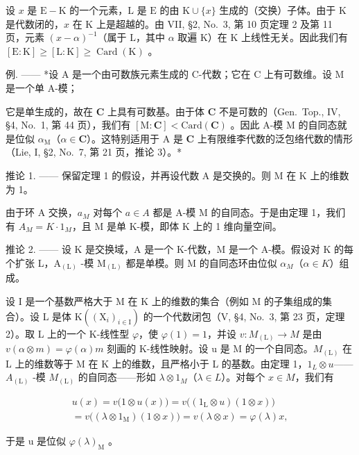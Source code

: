 设 \(x\) 是 \(\mathrm{E} - \mathrm{K}\) 的一个元素，\(\mathrm{L}\) 是 \(\mathrm{E}\) 的由 \(\mathrm{K} \cup \{x\}\) 生成的（交换）子体。由于 \(\mathrm{K}\) 是代数闭的，\(x\) 在 \(\mathrm{K}\) 上是超越的。由 VII, §2, No.~3, 第 10 页定理 2 及第 11 页，元素 \((x - \alpha)^{-1}\)（属于 \(\mathrm{L}\)，其中 \(\alpha\) 取遍 \(\mathrm{K}\)）在 \(\mathrm{K}\) 上线性无关。因此我们有 \([\mathrm{E} : \mathrm{K}] \geqslant [\mathrm{L} : \mathrm{K}] \geqslant \operatorname{Card}(\mathrm{K})\) 。

例. —— *设 A 是一个由可数族元素生成的 C-代数；它在 C 上有可数维。设 M 是一个单 A-模；

它是单生成的，故在 \(\mathbf{C}\) 上具有可数基。由于体 \(\mathbf{C}\) 不是可数的（Gen.~Top., IV, §4, No.~1, 第 44 页），我们有 \([\mathrm{M}:\mathbf{C}] < \mathrm{Card}(\mathbf{C})\) 。因此 A-模 M 的自同态就是位似 \(\alpha_{\mathrm{M}}\)（\(\alpha \in \mathbf{C}\)）。这特别适用于 A 是 \(\mathbf{C}\) 上有限维李代数的泛包络代数的情形（Lie, I, §2, No.~7, 第 21 页，推论 3）。*

推论 1. —— 保留定理 1 的假设，并再设代数 A 是交换的。则 M 在 K 上的维数为 1。

由于环 A 交换，\(a_{M}\) 对每个 \(a \in A\) 都是 A-模 M 的自同态。于是由定理 1，我们有 \(A_{M} = K \cdot 1_{M}\)，且 M 是单 K-模，即体 K 上的 1 维向量空间。

推论 2. —— 设 K 是交换域，A 是一个 K-代数，M 是一个 A-模。假设对 K 的每个扩张 L，\(\mathrm{A}_{(\mathrm{L})}\) -模 \(\mathrm{M}_{(\mathrm{L})}\) 都是单模。则 M 的自同态环由位似 \(\alpha_{M}\)（\(\alpha \in K\)）组成。

设 I 是一个基数严格大于 M 在 K 上的维数的集合（例如 M 的子集组成的集合）。设 L 是体 \(\mathrm{K}((\mathrm{X}_{i})_{i\in\mathrm{I}})\) 的一个代数闭包（V, §4, No.~3, 第 23 页，定理 2）。取 L 上的一个 K-线性型 \(\varphi\)，使 \(\varphi(1)=1\)，并设 \(v:M_{(\mathrm{L})}\to M\) 是由 \(v(\alpha\otimes m)=\varphi(\alpha)m\) 刻画的 K-线性映射。设 u 是 M 的一个自同态。\(M_{(\mathrm{L})}\) 在 L 上的维数等于 M 在 K 上的维数，且严格小于 L 的基数。由定理 1，\(1_{L}\otimes u\)——\(A_{(\mathrm{L})}\) -模 \(M_{(\mathrm{L})}\) 的自同态——形如 \(\lambda\otimes1_{M}\)（\(\lambda\in L\)）。对每个 \(x\in M\)，我们有

\[
\begin{array}{c} u (x) = v \bigl (1 \otimes u (x) \bigr) = v \bigl ((1 _ {\mathrm{L}} \otimes u) (1 \otimes x) \bigr) \\ = v \bigl ((\lambda \otimes 1 _ {\mathrm{M}}) (1 \otimes x) \bigr) = v (\lambda \otimes x) = \varphi (\lambda) x, \end{array}
\]

于是 u 是位似 \(\varphi(\lambda)_{\mathrm{M}}\) 。

